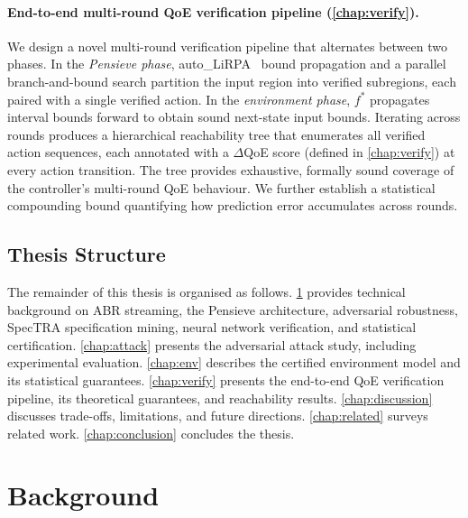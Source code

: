 \documentclass[thesis]{uofithesis} %
\begin{document}
    \paragraph{End-to-end multi-round QoE verification pipeline
               (\ref{chap:verify}).}
    We design a novel multi-round verification pipeline that alternates
    between two phases.  In the \emph{Pensieve phase},
    auto\_LiRPA~\cite{auto-lirpa} bound propagation and a parallel
    branch-and-bound search partition the input region into verified
    subregions, each paired with a single verified action.  In the
    \emph{environment phase}, $f^{\ast}$ propagates interval bounds
    forward to obtain sound next-state input bounds.  Iterating across
    rounds produces a hierarchical reachability tree that enumerates
    all verified action sequences, each annotated with a $\Delta$QoE
    score (defined in \ref{chap:verify}) at every action transition.
    The tree provides exhaustive, formally sound coverage of the
    controller's multi-round QoE behaviour.  We further establish a
    statistical compounding bound quantifying how prediction error
    accumulates across rounds.
 
 
    \subsection{Thesis Structure}
    \label{subsec:structure}
 
    The remainder of this thesis is organised as follows.
    \ref{chap:background} provides technical background on ABR
    streaming, the Pensieve architecture, adversarial robustness,
    SpecTRA specification mining, neural network verification, and
    statistical certification.
    \ref{chap:attack} presents the adversarial attack study, including
    experimental evaluation.
    \ref{chap:env} describes the certified environment model and its
    statistical guarantees.
    \ref{chap:verify} presents the end-to-end QoE verification
    pipeline, its theoretical guarantees, and reachability results.
    \ref{chap:discussion} discusses trade-offs, limitations, and future
    directions.
    \ref{chap:related} surveys related work.
    \ref{chap:conclusion} concludes the thesis.

\section{Background}
    \label{chap:background}
    
\end{document}
